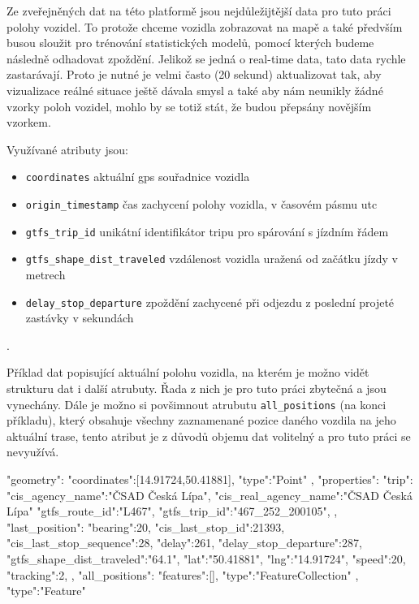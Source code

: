 Ze zveřejněných dat na této platformě jsou nejdůležijtější data pro tuto práci polohy vozidel. To protože chceme vozidla zobrazovat na mapě a také předvším busou sloužit pro trénování statistických modelů, pomocí kterých budeme následně odhadovat zpoždění. Jelikož se jedná o real-time data, tato data rychle zastarávají. Proto je nutné je velmi často (20 sekund) aktualizovat tak, aby vizualizace reálné situace ještě dávala smysl a také aby nám neunikly žádné vzorky poloh vozidel, mohlo by se totiž stát, že budou přepsány novějším vzorkem.

\bigbreak

Využívané atributy jsou:

\begin{itemize}
	\item \verb-coordinates- aktuální \gls{gps} souřadnice vozidla

	\item \verb-origin_timestamp- čas zachycení polohy vozidla, v časovém pásmu \gls{utc}

	\item \verb-gtfs_trip_id- unikátní identifikátor tripu pro spárování s jízdním řádem

	\item \verb-gtfs_shape_dist_traveled- vzdálenost vozidla uražená od začátku jízdy v metrech

	\item \verb-delay_stop_departure- zpoždění zachycené při odjezdu z poslední projeté zastávky v sekundách
\end{itemize}.

Příklad dat popisující aktuální polohu vozidla, na kterém je možno vidět strukturu dat i další atrubuty. Řada z nich je pro tuto práci zbytečná a jsou vynechány. Dále je možno si povšimnout atrubutu \verb-all_positions- (na konci příkladu), který obsahuje všechny zaznamenané pozice daného vozdila na jeho aktuální trase, tento atribut je z důvodů objemu dat volitelný a pro tuto práci se nevyužívá.

\begin{code}[frame=none]
"geometry":{
  "coordinates":[14.91724,50.41881],
  "type":"Point"
},
"properties":{
  "trip":{
    "cis_agency_name":"ČSAD Česká Lípa",
	"cis_real_agency_name":"ČSAD Česká Lípa"
	"gtfs_route_id":"L467",
	"gtfs_trip_id":"467_252_200105",
  },
  "last_position":{
    "bearing":20,
	"cis_last_stop_id":21393,
	"cis_last_stop_sequence":28,
	"delay":261,
	"delay_stop_departure":287,
	"gtfs_shape_dist_traveled":"64.1",
	"lat":"50.41881",
	"lng":"14.91724",
	"speed":20,
	"tracking":2,
	},
  "all_positions":{
    "features":[],
	"type":"FeatureCollection"
  }
},
"type":"Feature"

\end{code}

